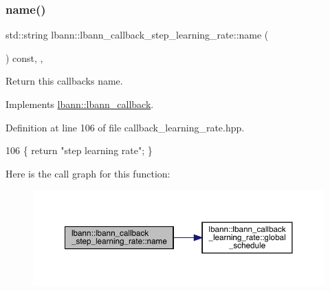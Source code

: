 \subsubsection{\texorpdfstring{name()}{name()}}
{\footnotesize\ttfamily std\+::string lbann\+::lbann\+\_\+callback\+\_\+step\+\_\+learning\+\_\+rate\+::name (\begin{DoxyParamCaption}{ }\end{DoxyParamCaption}) const\hspace{0.3cm}{\ttfamily [inline]}, {\ttfamily [override]}, {\ttfamily [virtual]}}

Return this callback\textquotesingle{}s name. 

Implements \hyperlink{classlbann_1_1lbann__callback_a7522c7a14f1d6a1ea762cc2d7248eb3a}{lbann\+::lbann\+\_\+callback}.



Definition at line 106 of file callback\+\_\+learning\+\_\+rate.\+hpp.


\begin{DoxyCode}
106 \{ \textcolor{keywordflow}{return} \textcolor{stringliteral}{"step learning rate"}; \}
\end{DoxyCode}
Here is the call graph for this function\+:\nopagebreak
\begin{figure}[H]
\begin{center}
\leavevmode
\includegraphics[width=350pt]{classlbann_1_1lbann__callback__step__learning__rate_a0332449e3d03aac46e0562cede85a5ed_cgraph}
\end{center}
\end{figure}
\mbox{\label{classlbann_1_1lbann__callback__step__learning__rate_a0e677a5365c5b2119520ea9efcbb0a77}} 
